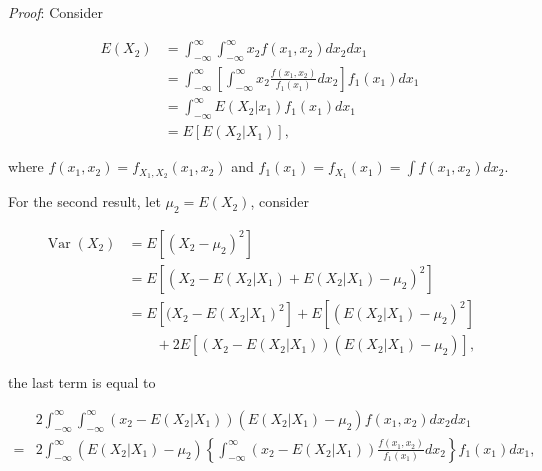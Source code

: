 \documentclass{article}
\begin{document}
                    \textit{Proof}: Consider

                    \begin{align*}
                        E(X_{2}) &= \int_{-\infty}^{\infty} \int_{-\infty}^{\infty} x_{2} f(x_{1}, x_{2}) d x_{2} d x_{1} \\
                                 &= \int_{-\infty}^{\infty} \left[
                                     \int_{-\infty}^{\infty} x_{2} \frac{f(x_{1}, x_{2})}{f_{1}(x_{1})} d x_{2} \right] f_{1}(x_{1}) d x_{1} \\
                                 &= \int_{-\infty}^{\infty} E(X_{2}|x_{1}) f_{1}(x_{1}) d x_{1} \\
                                 &= E[E(X_{2}|X_{1})],
                    \end{align*}

                    where $ f(x_{1}, x_{2}) = f_{X_{1},X_{2}}(x_{1}, x_{2}) $
                    and $ f_{1}(x_{1}) = f_{X_{1}}(x_{1}) = \int f(x_{1},
                    x_{2}) d x_{2} $.

                    For the second result, let $ \mu_{2} = E(X_{2}) $, consider

                    \begin{align*}
                        \operatorname{Var}(X_{2}) &= E[(X_{2} - \mu_{2})^{2}] \\
                                                  &= E \left[ (X_{2} - E(X_{2}|X_{1}) + E(X_{2}|X_{1}) - \mu_{2})^{2} \right] \\
                                                  &= E \left[ (X_{2} - E(X_{2}|X_{1})^2 \right] + E \left[ (E(X_{2}|X_{1}) - \mu_{2})^2 \right] \\
                                                  &\qquad + 2E \left[ (X_{2} - E(X_{2}|X_{1}))(E(X_{2}|X_{1}) - \mu_{2}) \right],
                    \end{align*}

                    the last term is equal to

                    \begin{align*}
                         &2\int_{-\infty}^{\infty} \int_{-\infty}^{\infty}
                             (x_{2} - E(X_{2}|X_{1}))(E(X_{2}|X_{1}) - \mu_{2}) f(x_{1}, x_{2}) d x_{2} d x_{1} \\
                        =&2\int_{-\infty}^{\infty} (E(X_{2}|X_{1}) - \mu_{2}) \left\{ \int_{-\infty}^{\infty}
                            (x_{2} - E(X_{2}|X_{1})) \frac{f(x_{1}, x_{2})}{f_{1}(x_{1})} d x_{2} \right\} f_{1}(x_{1}) d x_{1},
                    \end{align*}
\end{document}

